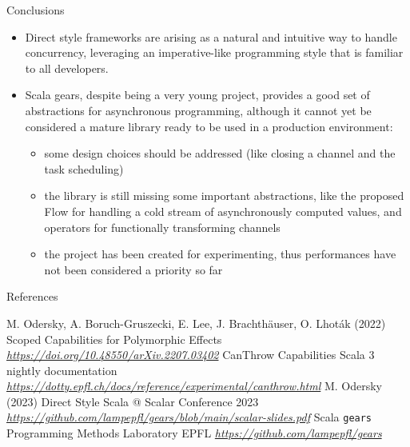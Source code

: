 \documentclass[aspectratio=169,xcolor=dvipsnames]{beamer}
\begin{document}

\begin{frame}{Conclusions}
    \begin{itemize}
        \item Direct style frameworks are arising as a natural and intuitive way to handle concurrency, leveraging an imperative-like programming style that is familiar to all developers.
        \item Scala gears, despite being a very young project, provides a good set of abstractions for asynchronous programming, although it cannot yet be considered a mature library ready to be used in a production environment:
        \begin{itemize}
            \item some design choices should be addressed (like closing a channel and the task scheduling)
            \item the library is still missing some important abstractions, like the proposed Flow for handling a cold stream of asynchronously computed values, and operators for functionally transforming channels
            \item  the project has been created for experimenting, thus performances have not been considered a priority so far
        \end{itemize}
    \end{itemize}
\end{frame}


\begin{frame}{References}
    \footnotesize{
        \begin{thebibliography}{99}
             M. Odersky, A. Boruch-Gruszecki, E. Lee, J. Brachthäuser, O. Lhoták (2022)
            \newblock Scoped Capabilities for Polymorphic Effects
            \newblock \emph{\href{https://doi.org/10.48550/arXiv.2207.03402}{https://doi.org/10.48550/arXiv.2207.03402}}
             CanThrow Capabilities 
            \newblock Scala 3 nightly documentation
            \newblock \emph{\href{https://dotty.epfl.ch/docs/reference/experimental/canthrow.html}{https://dotty.epfl.ch/docs/reference/experimental/canthrow.html}}
             M. Odersky (2023)
            \newblock Direct Style Scala @ Scalar Conference 2023 
            \newblock \emph{\href{https://github.com/lampepfl/gears/blob/main/scalar-slides.pdf}{https://github.com/lampepfl/gears/blob/main/scalar-slides.pdf}}
             Scala \texttt{gears}
            \newblock Programming Methods Laboratory EPFL
            \newblock \emph{\href{https://github.com/lampepfl/gears}{https://github.com/lampepfl/gears}}
        \end{thebibliography}
    }
\end{frame}

\end{document}
